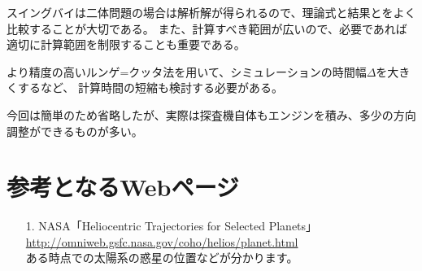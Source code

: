 \documentclass{article}
\begin{document}
スイングバイは二体問題の場合は解析解が得られるので、理論式と結果とをよく比較することが大切である。
また、計算すべき範囲が広いので、必要であれば適切に計算範囲を制限することも重要である。

より精度の高いルンゲ=クッタ法を用いて、シミュレーションの時間幅$\Delta$を大きくするなど、
計算時間の短縮も検討する必要がある。

今回は簡単のため省略したが、実際は探査機自体もエンジンを積み、多少の方向調整ができるものが多い。

\section{ 参考となるWebページ }

\begin{itemize}
\item[1.] NASA「Heliocentric Trajectories for Selected Planets」\\ \url{http://omniweb.gsfc.nasa.gov/coho/helios/planet.html}
       \\ ある時点での太陽系の惑星の位置などが分かります。
\end{itemize}
\end{document}
